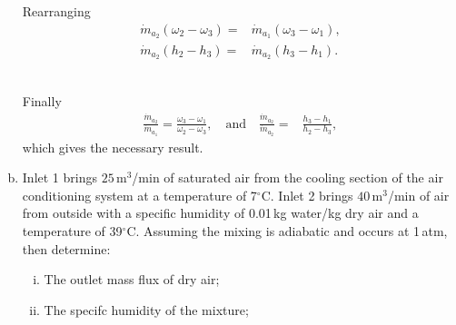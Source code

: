\documentclass[calculator,datasheet,sample]{exam}
\begin{document}
\begin{question}
\begin{enumerate}[(a)]
{Rearranging
\begin{align*}
 \dot{m}_{a_2} \left(\omega_2 - \omega_3\right) =& \dot{m}_{a_1} \left(\omega_3 - \omega_1\right), \\
 \dot{m}_{a_2} \left(h_2 - h_3\right) =& \dot{m}_{a_2} \left(h_3 - h_1\right).
\end{align*}~

Finally
\begin{align*}
 \frac{\dot{m}_{a_2}}{\dot{m}_{a_1}} = \frac{\omega_3 - \omega_1}{\omega_2 - \omega_3}, \quad \mbox{and} \quad \frac{\dot{m}_{a_2}}{\dot{m}_{a_2}} =& \frac{h_3 - h_1}{h_2 - h_3},
\end{align*}
which gives the necessary result.
}

\item Inlet 1 brings $25$\,m$^3$/min of saturated air from the cooling section of the air conditioning system at a temperature of 7$^\circ$C. Inlet 2 brings $40$\,m$^3$/min of air from outside with a specific humidity of 0.01\,kg water/kg dry air and a temperature of 39$^\circ$C. Assuming the mixing is adiabatic and occurs at 1\,atm, then determine:

\begin{enumerate}[i)]
\item The outlet mass flux of dry air;~


\item The specifc humidity of the mixture;~
\end{enumerate}
\end{enumerate}
\end{question}
\end{document}
